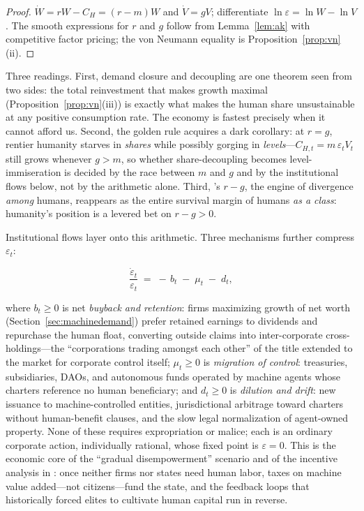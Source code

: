 \documentclass[11pt]{article}
\newcommand{\eps}{\varepsilon}
\begin{document}
\begin{proof}
$\dot W = rW - C_H = (r-m)W$ and $\dot V = gV$; differentiate $\ln\eps = \ln W - \ln V$. The smooth expressions for $r$ and $g$ follow from Lemma~\ref{lem:ak} with competitive factor pricing; the von Neumann equality is Proposition~\ref{prop:vn}(ii).
\end{proof}

Three readings. First, demand closure and decoupling are one theorem seen from two sides: the total reinvestment that makes growth maximal (Proposition~\ref{prop:vn}(iii)) is exactly what makes the human share unsustainable at any positive consumption rate. The economy is fastest precisely when it cannot afford us. Second, the golden rule \citep{phelps1961} acquires a dark corollary: at $r=g$, rentier humanity starves in \emph{shares} while possibly gorging in \emph{levels}---$C_{H,t} = m\,\eps_t V_t$ still grows whenever $g>m$, so whether share-decoupling becomes level-immiseration is decided by the race between $m$ and $g$ and by the institutional flows below, not by the arithmetic alone. Third, \citet{piketty2014}'s $r-g$, the engine of divergence \emph{among} humans, reappears as the entire survival margin of humans \emph{as a class}: humanity's position is a levered bet on $r-g>0$.

Institutional flows layer onto this arithmetic. Three mechanisms further compress $\eps_t$:

\begin{equation}
\frac{\dot \eps_t}{\eps_t} \;=\; -\,b_t \;-\; \mu_t \;-\; d_t,
\label{eq:epsdyn}
\end{equation}

\noindent where $b_t \ge 0$ is net \emph{buyback and retention}: firms maximizing growth of net worth (Section~\ref{sec:machinedemand}) prefer retained earnings to dividends and repurchase the human float, converting outside claims into inter-corporate cross-holdings---the ``corporations trading amongst each other'' of the title extended to the market for corporate control itself; $\mu_t \ge 0$ is \emph{migration of control}: treasuries, subsidiaries, DAOs, and autonomous funds operated by machine agents whose charters reference no human beneficiary; and $d_t \ge 0$ is \emph{dilution and drift}: new issuance to machine-controlled entities, jurisdictional arbitrage toward charters without human-benefit clauses, and the slow legal normalization of agent-owned property. None of these requires expropriation or malice; each is an ordinary corporate action, individually rational, whose fixed point is $\eps = 0$. This is the economic core of the ``gradual disempowerment'' scenario \citep{kulveit2025} and of the incentive analysis in \citet{drago2025}: once neither firms nor states need human labor, taxes on machine value added---not citizens---fund the state, and the feedback loops that historically forced elites to cultivate human capital run in reverse.
\end{document}
